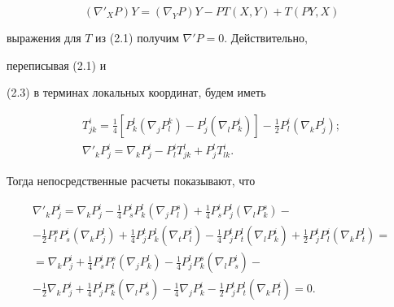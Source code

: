 \begin{equation} 


(\nabla'_X P)Y=(\nabla_Y P)Y-PT(X,Y)+T(PY,X) 


\end{equation} 


выражения для $T$ из (2.1) получим $\nabla'P=0$. Действительно, 


переписывая (2.1) и 


(2.3) в терминах локальных координат, будем иметь 


\begin{gather} 


T^i_{jk}=\frac{1}{4}[P^l_k(\nabla_j P^k_l)- 


P^l_j(\nabla_lP^i_k)]-\frac{1}{2}P^i_l 


(\nabla_k P^l_j);\\ 


\nabla'_k P^i_j=\nabla_k P^i_j-P^i_l T^l_{jk}+ 


P^l_j T^i_{lk}.


\end{gather} 


Тогда непосредственные расчеты показывают, что 


\begin{gather*} 


\nabla'_k P^i_j=\nabla_k P^i_j-\frac{1}{4} 


P^i_s P^l_k(\nabla_j P^s_l)+\frac{1}{4} 


P^i_s P^l_j(\nabla_l P^s_k)- \\ 


-\frac{1}{2}P^s_l P^i_s(\nabla_k P^l_j)+\frac{1}{4} 


P^t_j P^l_k(\nabla_t P^i_l)-\frac{1}{4} 


P^t_j P^l_t(\nabla_l P^i_k)+\frac{1}{2} 


P^t_j P^i_l(\nabla_k P^l_t)= \\ 


=\nabla_k P^i_j+\frac{1}{4}P^i_s P^s_l(\nabla_j P^l_k)- 


\frac{1}{4}P^l_j P^s_k(\nabla_l P^i_s)- \\ 


-\frac{1}{2}\nabla_k P^i_j+\frac{1}{4}P^l_j P^s_k 


(\nabla_l P^i_s)-\frac{1}{4}\nabla_j P^i_k- 


\frac{1}{2}P^t_j P^l_t(\nabla_k P^i_l)=0. 


\end{gather*} 


